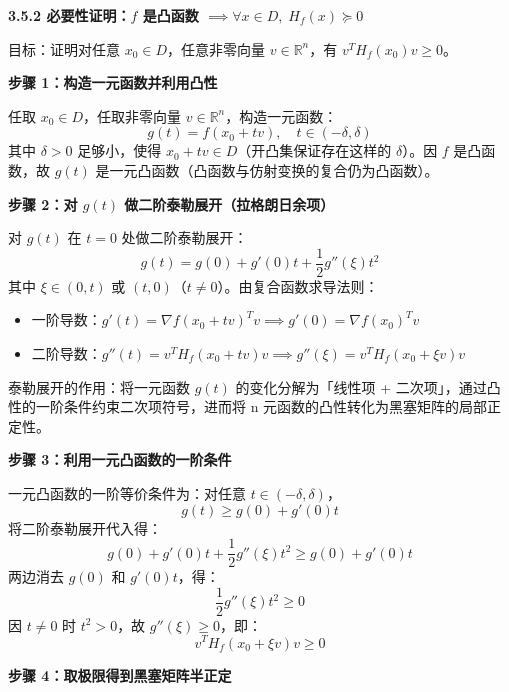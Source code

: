 \documentclass[10pt]{article}
\numberwithin{equation}{section}
\theoremstyle{plain}
\theoremstyle{definition}
\theoremstyle{remark}
\newcommand{\R}{\mathbb{R}}
\begin{document}
\textbf{3.5.2 必要性证明：$f$ 是凸函数 $\implies\forall x\in D,\;H_f(x)\succeq 0$}

目标：证明对任意 $x_0\in D$，任意非零向量 $v\in\R^n$，有 $v^TH_f(x_0)v\geq 0$。

{\par\vspace{0.8ex}\noindent\normalsize\bfseries\color{secblue} 步骤 1：构造一元函数并利用凸性\par}

任取 $x_0\in D$，任取非零向量 $v\in\R^n$，构造一元函数：
\[g(t)=f(x_0+tv),\quad t\in(-\delta,\delta)\]
其中 $\delta>0$ 足够小，使得 $x_0+tv\in D$（开凸集保证存在这样的 $\delta$）。因 $f$ 是凸函数，故 $g(t)$ 是一元凸函数（凸函数与仿射变换的复合仍为凸函数）。

{\par\vspace{0.8ex}\noindent\normalsize\bfseries\color{secblue} 步骤 2：对 $g(t)$ 做二阶泰勒展开（拉格朗日余项）\par}

对 $g(t)$ 在 $t=0$ 处做二阶泰勒展开：
\[g(t)=g(0)+g'(0)t+\frac{1}{2}g''(\xi)t^2\]
其中 $\xi\in(0,t)$ 或 $(t,0)$（$t\neq 0$）。由复合函数求导法则：
\begin{itemize}
	\item 一阶导数：$g'(t)=\nabla f(x_0+tv)^Tv\implies g'(0)=\nabla f(x_0)^Tv$
	\item 二阶导数：$g''(t)=v^TH_f(x_0+tv)v\implies g''(\xi)=v^TH_f(x_0+\xi v)v$
\end{itemize}

泰勒展开的作用：将一元函数 $g(t)$ 的变化分解为「线性项 + 二次项」，通过凸性的一阶条件约束二次项符号，进而将 n 元函数的凸性转化为黑塞矩阵的局部正定性。

{\par\vspace{0.8ex}\noindent\normalsize\bfseries\color{secblue} 步骤 3：利用一元凸函数的一阶条件\par}

一元凸函数的一阶等价条件为：对任意 $t\in(-\delta,\delta)$，
\[g(t)\geq g(0)+g'(0)t\]
将二阶泰勒展开代入得：
\[g(0)+g'(0)t+\frac{1}{2}g''(\xi)t^2\geq g(0)+g'(0)t\]
两边消去 $g(0)$ 和 $g'(0)t$，得：
\[\frac{1}{2}g''(\xi)t^2\geq 0\]
因 $t\neq 0$ 时 $t^2>0$，故 $g''(\xi)\geq 0$，即：
\[v^TH_f(x_0+\xi v)v\geq 0\]

{\par\vspace{0.8ex}\noindent\normalsize\bfseries\color{secblue} 步骤 4：取极限得到黑塞矩阵半正定\par}
\end{document}
